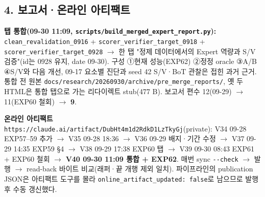 \subsection{4. 보고서·온라인 아티팩트}
\par\noindent \textbullet\enspace \textbf{탭 통합(09-30 11:09, \texttt{scripts/\allowbreak{}\allowbreak{}build\_\allowbreak{}\allowbreak{}me\allowbreak{}rged\_\allowbreak{}\allowbreak{}exp\allowbreak{}ert\_\allowbreak{}\allowbreak{}repo\allowbreak{}rt.\allowbreak{}py}):} \texttt{clean\_\allowbreak{}\allowbreak{}re\allowbreak{}validati\allowbreak{}on\_\allowbreak{}\allowbreak{}0916} +\allowbreak{} \texttt{scorer\_\allowbreak{}\allowbreak{}v\allowbreak{}erifier\_\allowbreak{}\allowbreak{}target\_\allowbreak{}\allowbreak{}0\allowbreak{}918} +\allowbreak{} \texttt{scorer\_\allowbreak{}\allowbreak{}v\allowbreak{}erifier\_\allowbreak{}\allowbreak{}target\_\allowbreak{}\allowbreak{}0\allowbreak{}928}  \ensuremath{\rightarrow}  한 탭 "정제 데이터에서의 Expert 역량과 S/\allowbreak{}V 검증"(id는 0928 유지, date 09-30). 구성 ①현재 성능(EXP62) ②정정 oracle ③A/\allowbreak{}B ④S/\allowbreak{}V와 다음 개선, 09-17 요소별 진단과 seed 42 S/\allowbreak{}V·BoT 관찰은 접힌 과거 근거. 통합 전 원본 \texttt{docs/\allowbreak{}\allowbreak{}res\allowbreak{}earch/\allowbreak{}\allowbreak{}20\allowbreak{}260930/\allowbreak{}\allowbreak{}a\allowbreak{}rchive/\allowbreak{}\allowbreak{}p\allowbreak{}re\_\allowbreak{}\allowbreak{}merge\allowbreak{}\_\allowbreak{}\allowbreak{}reports\allowbreak{}/\allowbreak{}\allowbreak{}}, 옛 두 HTML은 통합 탭으로 가는 리다이렉트 stub(477 B). 보고서 편수 12(09-29)  \ensuremath{\rightarrow}  11(EXP60 철회)  \ensuremath{\rightarrow}  \textbf{9}.


\par\noindent \textbullet\enspace \textbf{온라인 아티팩트} \texttt{https:/\allowbreak{}\allowbreak{}/\allowbreak{}\allowbreak{}claude.\allowbreak{}a\allowbreak{}i/\allowbreak{}\allowbreak{}artifa\allowbreak{}ct/\allowbreak{}\allowbreak{}DubHt\allowbreak{}4m1d2Rdk\allowbreak{}D1LzTkyG\allowbreak{}j}(private): V34 09-28 EXP57–59 추가  \ensuremath{\rightarrow}  V35 09-28 18:36  \ensuremath{\rightarrow}  V36 09-29 배지·기간 수정  \ensuremath{\rightarrow}  V37 09-29 14:35 EXP59 §4  \ensuremath{\rightarrow}  V38 09-29 17:38 EXP60 탭  \ensuremath{\rightarrow}  V39 09-30 08:43 EXP61 +\allowbreak{} EXP60 철회  \ensuremath{\rightarrow}  \textbf{V40 09-30 11:09 통합 +\allowbreak{} EXP62}. 매번 sync \texttt{-\allowbreak{}-\allowbreak{}check}  \ensuremath{\rightarrow}  발행  \ensuremath{\rightarrow}  read-back 바이트 비교(래퍼·끝 개행 제외 일치). 파이프라인의 publication JSON은 아티팩트 도구를 몰라 \texttt{online\_\allowbreak{}\allowbreak{}a\allowbreak{}rtifact\_\allowbreak{}\allowbreak{}updated:\allowbreak{} false}로 남으므로 발행 후 수동 갱신했다.


